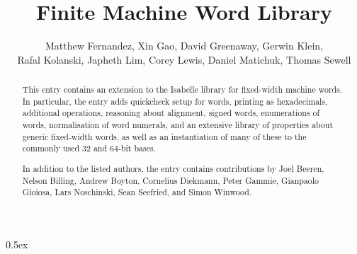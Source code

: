 \documentclass[11pt,a4paper]{article}
\begin{document}
\title{Finite Machine Word Library}
\author{Matthew Fernandez, Xin Gao, David Greenaway, Gerwin Klein,\\
       Rafal Kolanski, Japheth Lim, Corey Lewis, Daniel Matichuk, Thomas Sewell}
\maketitle

\begin{abstract}  
  This entry contains an extension to the Isabelle library for fixed-width
  machine words. In particular, the entry adds quickcheck setup for words,
  printing as hexadecimals, additional operations, reasoning about alignment,
  signed words, enumerations of words, normalisation of word numerals, and an
  extensive library of properties about generic fixed-width words, as well as
  an instantiation of many of these to the commonly used 32 and 64-bit bases.
  
  In addition to the listed authors, the entry contains contributions by
  Joel Beeren, Nelson Billing, Andrew Boyton, Cornelius Diekmann, Peter Gammie, 
  Gianpaolo Gioiosa, Lars Noschinski, Sean Seefried, and Simon Winwood.
\end{abstract}

\tableofcontents

\parindent 0pt\parskip 0.5ex


\end{document}
